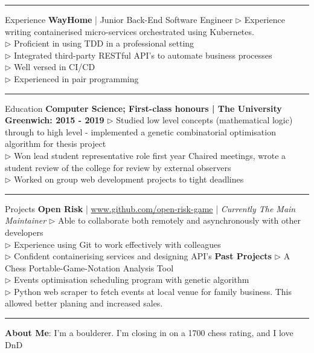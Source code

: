 \documentclass[12pt,twoside]{article}
\begin{document}
\vspace{0.5em}
\hrule
\vspace{0.5em}

\headedsection
    {Experience}
    {
        \textbf{WayHome} | Junior Back-End Software Engineer}
    {
        $\triangleright$ Experience writing containerised micro-services
        orchestrated using Kubernetes. \\
        $\triangleright$ Proficient in using TDD in a professional setting \\
        $\triangleright$ Integrated third-party RESTful API's to automate business processes \\
        $\triangleright$ Well versed in CI/CD \\
        $\triangleright$ Experienced in pair programming
    }

\vspace{0.5em}
\hrule
\vspace{0.5em}

\headedsection
    {Education}
    {
        \textbf{Computer Science; First-class honours | The University
        Greenwich: 2015 - 2019}
    }
    {
        $\triangleright$ Studied low level concepts (mathematical logic)
        through to high level - implemented a genetic combinatorial optimisation
        algorithm for thesis project \\
        $\triangleright$ Won lead student representative role first year
        Chaired meetings, wrote a student review of the college for review by
        external observers \\
        $\triangleright$ Worked on group web development projects to tight deadlines
    }

\vspace{0.5em}
\hrule
\vspace{0.5em}

\headedsection
    {Projects}
    {\textbf{Open Risk} | \url{www.github.com/open-risk-game} | \textit{Currently The Main Maintainer}}
    {
        $\triangleright$ Able to collaborate both remotely and asynchronously with other developers \\
        $\triangleright$ Experience using Git to work effectively with colleagues \\
        $\triangleright$ Confident containerising services and designing API's
    }
\headedsection
    {}
    {\textbf{Past Projects}}
    {
        $\triangleright$ A Chess Portable-Game-Notation Analysis Tool \\
        $\triangleright$ Events optimisation scheduling program with genetic algorithm \\
        $\triangleright$ Python web scraper to fetch events at local venue for
        family business. This allowed better planing and increased sales.
    }

\vspace{0.5em}
\hrule
\vspace{0.5em}

\hspace{-1.3em}\textbf{About Me}: I'm a boulderer. I'm closing in on a 1700 chess rating, and I love DnD
\end{document}
